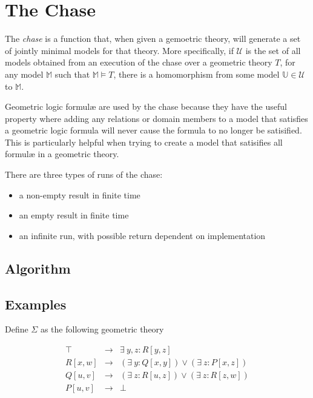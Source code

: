 \section{The Chase}

	The \emph{chase} is a function that, when given a gemoetric theory, will
	generate a set of jointly minimal models for that theory. More
	specifically, if $\mathcal{U}$ is the set of all models obtained from an
	execution of the chase over a geometric theory $T$, for any model
	$\mathbb{M}$ such that $\mathbb{M} \models T$, there is a homomorphism from
	some model $\mathbb{U} \in \mathcal{U}$ to $\mathbb{M}$.

	Geometric logic formul{\ae} are used by the chase because they have the
	useful property where adding any relations or domain members to a model
	that satisfies a geometric logic formula will never cause the formula to no
	longer be satisified. This is particularly helpful when trying to create a
	model that satisifies all formul{\ae} in a geometric theory.

	There are three types of runs of the chase:
	\begin{itemize}
	\item a non-empty result in finite time
	\item an empty result in finite time
	\item an infinite run, with possible return dependent on implementation
	\end{itemize}

	\subsection{Algorithm}

	\subsection{Examples}

		Define $\Sigma$ as the following geometric theory

		\begin{eqnarray}
			\top    &  \to  &  \exists\ y,z : R[y,z]                             \\
			R[x,w]  &  \to  &  (\exists\ y : Q[x,y]) \vee (\exists\ z : P[x,z])  \\
			Q[u,v]  &  \to  &  (\exists\ z : R[u,z]) \vee (\exists\ z : R[z,w])  \\
			P[u,v]  &  \to  &  \bot
		\end{eqnarray}

